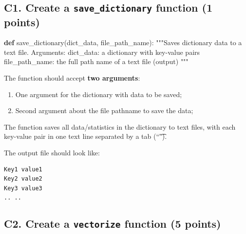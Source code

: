 \documentclass[
  letterpaper,
]{scrbook}
\newenvironment{Shaded}{\begin{snugshade}}{\end{snugshade}}
\newcommand{\CommentTok}[1]{\textcolor[rgb]{0.37,0.37,0.37}{#1}}
\newcommand{\KeywordTok}[1]{\textcolor[rgb]{0.00,0.23,0.31}{\textbf{#1}}}
\newcommand{\NormalTok}[1]{\textcolor[rgb]{0.00,0.23,0.31}{#1}}
\providecommand{\tightlist}{%
  \setlength{\itemsep}{0pt}\setlength{\parskip}{0pt}}
\begin{document}

\subsection*{\texorpdfstring{C1. Create a \texttt{save\_dictionary}
function (1
points)}{C1. Create a save\_dictionary function (1 points)}}\label{c1.-create-a-save_dictionary-function-1-points}

\begin{Shaded}
\begin{Highlighting}[]
\KeywordTok{def}\NormalTok{ save\_dictionary(dict\_data, file\_path\_name):}
    \CommentTok{"""Saves dictionary data to a text file. }
\CommentTok{    Arguments: }
\CommentTok{        dict\_data: a dictionary with key{-}value pairs}
\CommentTok{        file\_path\_name: the full path name of a text file (output)}
\CommentTok{    """}
\end{Highlighting}
\end{Shaded}

The function should accept \textbf{two arguments}:

\begin{enumerate}
\def\labelenumi{\arabic{enumi}.}
\tightlist
\item
  One argument for the dictionary with data to be saved;
\item
  Second argument about the file pathname to save the data;
\end{enumerate}

The function saves all data/statistics in the dictionary to text files,
with each key-value pair in one text line separated by a tab (``\t").

The output file should look like:

\begin{verbatim}
Key1 value1
Key2 value2
Key3 value3
.. ..
\end{verbatim}

\subsection*{\texorpdfstring{C2. Create a \texttt{vectorize} function (5
points)}{C2. Create a vectorize function (5 points)}}\label{c2.-create-a-vectorize-function-5-points}
\end{document}
